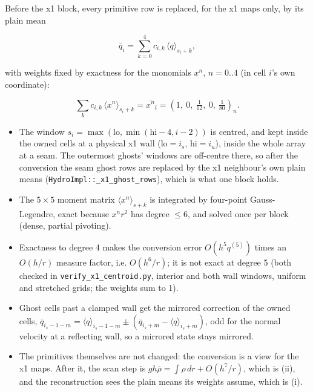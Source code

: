 \documentclass[11pt,a4paper]{article}
\begin{document}
Before the x1 block, every primitive row is replaced, for the x1 maps only, by its plain mean

\begin{equation*}
\overline{q}_i = \sum_{k=0}^{4} c_{i,k}\,\langle q\rangle_{s_i + k},
\end{equation*}

with weights fixed by exactness for the monomials $x^n$, $n = 0..4$ (in cell $i$'s own coordinate):

\begin{equation*}
\sum_{k} c_{i,k}\,\langle x^n\rangle_{s_i+k} = \overline{x^n}_i = \left(1,\ 0,\ \tfrac{1}{12},\ 0,\ \tfrac{1}{80}\right)_n .
\end{equation*}

\begin{itemize}
\item The window $s_i = \max(\mathrm{lo}, \min(\mathrm{hi}-4, i-2))$ is centred, and kept inside the owned cells at
  a physical x1 wall ($\mathrm{lo} = i_s$, $\mathrm{hi} = i_u$), inside the whole array at a seam. The
  outermost ghosts' windows are off-centre there, so after the conversion the seam ghost rows are replaced
  by the x1 neighbour's own plain means (\texttt{HydroImpl::\_x1\_ghost\_rows}), which is what one block holds.
\item The $5\times5$ moment matrix $\langle x^n\rangle_{s+k}$ is integrated by four-point Gauss-Legendre, exact
  because $x^n r^2$ has degree $\le 6$, and solved once per block (dense, partial pivoting).
\item Exactness to degree 4 makes the conversion error $O(h^5 q^{(5)})$ times an $O(h/r)$ measure factor, i.e.
  $O(h^6/r)$; it is not exact at degree 5 (both checked in \texttt{verify\_x1\_centroid.py}, interior and both wall
  windows, uniform and stretched grids; the weights sum to 1).
\item Ghost cells past a clamped wall get the mirrored correction of the owned cells,
  $\overline{q}_{i_s-1-m} = \langle q\rangle_{i_s-1-m} \pm (\overline{q}_{i_s+m} - \langle q\rangle_{i_s+m})$,
  odd for the normal velocity at a reflecting wall, so a mirrored state stays mirrored.
\item The primitives themselves are not changed: the conversion is a view for the x1 maps. After it, the scan step
  is $g h\overline\rho = \int \rho\,dr + O(h^7/r)$, which is (ii), and the reconstruction sees the plain means
  its weights assume, which is (i).
\end{itemize}
\end{document}
